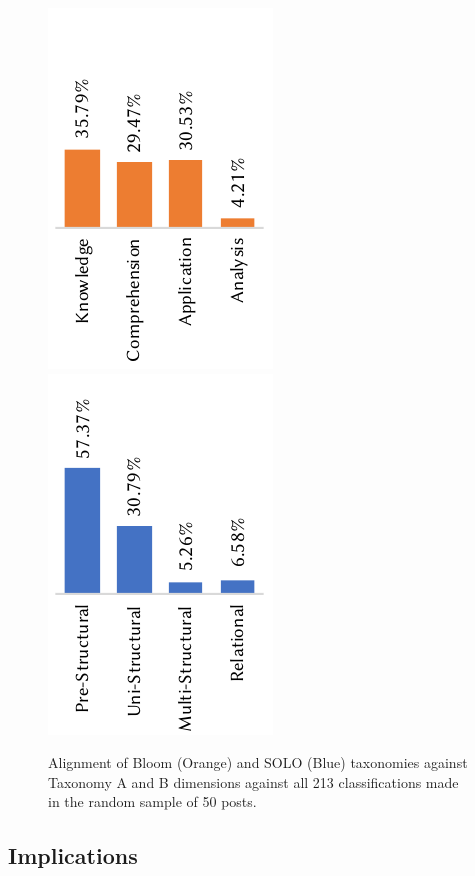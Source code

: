 \begin{figure}[t]
  \centering
  \includegraphics[width=.29\linewidth]{bloom}\includegraphics[width=.29\linewidth]{solo} 
  \caption{
    Alignment of Bloom (Orange) and SOLO (Blue) taxonomies against Taxonomy A and B dimensions against all 213 classifications made in the random sample of 50 posts.
  }
  \label{icse2020:fig:alignment-of-blooms-solo}
\end{figure}

\subsection{Implications}
\label{icse2020:ssec:findings:documentation-vs-education}



